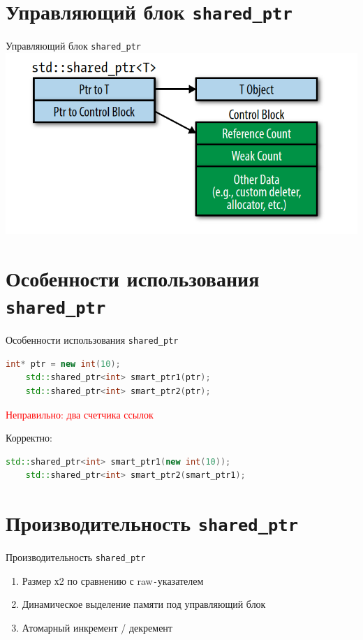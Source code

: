\documentclass[10pt]{beamer}
\begin{document}
\section{Управляющий блок \texttt{shared\_ptr}}
\begin{frame}[fragile]{Управляющий блок \texttt{shared\_ptr}}
\includegraphics[scale=0.75]{Term_3/Source/Pictures/shared.png}
\end{frame}

\section{Особенности использования \texttt{shared\_ptr}}
\begin{frame}[fragile]{Особенности использования \texttt{shared\_ptr}}
\begin{lstlisting}[language=C++]
    int* ptr = new int(10);
    std::shared_ptr<int> smart_ptr1(ptr);
    std::shared_ptr<int> smart_ptr2(ptr);
\end{lstlisting}
\pause
\textcolor{red}{Неправильно: два счетчика ссылок}

\pause

Корректно:
\begin{lstlisting}[language=C++]
    std::shared_ptr<int> smart_ptr1(new int(10));
    std::shared_ptr<int> smart_ptr2(smart_ptr1); 
\end{lstlisting}
\end{frame}

\section{Производительность \texttt{shared\_ptr}}
\begin{frame}[fragile]{Производительность \texttt{shared\_ptr}}
\begin{enumerate}
    \item Размер х2 по сравнению с raw\texttt{-}указателем
    \item Динамическое выделение памяти под управляющий блок
    \item Атомарный инкремент / декремент
\end{enumerate}
\end{frame}
\end{document}
